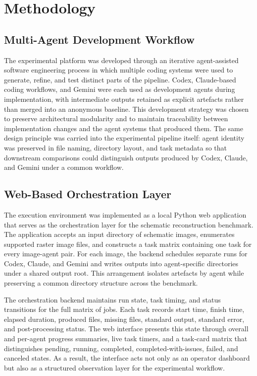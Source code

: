 \section{Methodology}

\subsection{Multi-Agent Development Workflow}

The experimental platform was developed through an iterative agent-assisted software engineering process in which multiple coding systems were used to generate, refine, and test distinct parts of the pipeline. Codex, Claude-based coding workflows, and Gemini were each used as development agents during implementation, with intermediate outputs retained as explicit artefacts rather than merged into an anonymous baseline. This development strategy was chosen to preserve architectural modularity and to maintain traceability between implementation changes and the agent systems that produced them. The same design principle was carried into the experimental pipeline itself: agent identity was preserved in file naming, directory layout, and task metadata so that downstream comparisons could distinguish outputs produced by Codex, Claude, and Gemini under a common workflow.

\subsection{Web-Based Orchestration Layer}

The execution environment was implemented as a local Python web application that serves as the orchestration layer for the schematic reconstruction benchmark. The application accepts an input directory of schematic images, enumerates supported raster image files, and constructs a task matrix containing one task for every image-agent pair. For each image, the backend schedules separate runs for Codex, Claude, and Gemini and writes outputs into agent-specific directories under a shared output root. This arrangement isolates artefacts by agent while preserving a common directory structure across the benchmark.

The orchestration backend maintains run state, task timing, and status transitions for the full matrix of jobs. Each task records start time, finish time, elapsed duration, produced files, missing files, standard output, standard error, and post-processing status. The web interface presents this state through overall and per-agent progress summaries, live task timers, and a task-card matrix that distinguishes pending, running, completed, completed-with-issues, failed, and canceled states. As a result, the interface acts not only as an operator dashboard but also as a structured observation layer for the experimental workflow.

